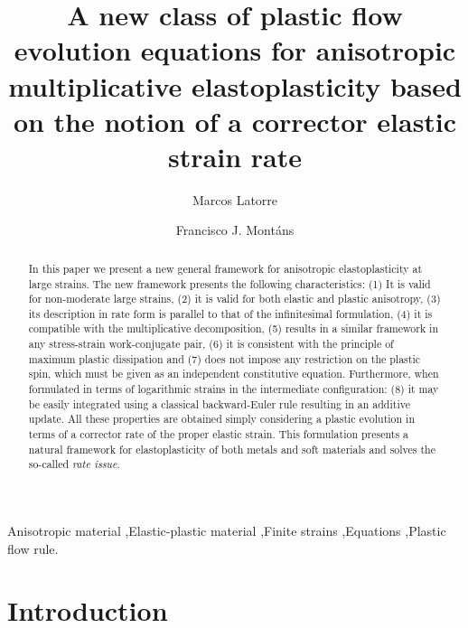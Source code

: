 \documentclass[preprint,review,12pt,sort&compress]{elsarticle}%
\begin{document}
\begin{frontmatter}
\title{A new class of plastic flow evolution equations for anisotropic
multiplicative elastoplasticity based on the notion of a corrector elastic strain rate}
\author[add1]{Marcos Latorre}
\author[add1]{Francisco J. Mont\'{a}ns}
\address[add1]{Escuela T\'{e}cnica Superior de Ingenier\'{\i}a Aeron\'{a}utica y del Espacio\\Universidad Polit\'{e}cnica de Madrid\\
Plaza Cardenal Cisneros, 3, 28040-Madrid, Spain\\}
\begin{abstract}
In this paper we present a new general framework for anisotropic elastoplasticity at large strains. The new framework
presents the following characteristics: (1) It is valid for non-moderate large strains, (2) it is valid for both elastic and
plastic anisotropy, (3) its description in rate form is parallel to that of the infinitesimal formulation, (4) it is compatible
with the multiplicative decomposition, (5) results in a similar framework in any stress-strain work-conjugate pair,
(6) it is consistent with the principle of maximum plastic dissipation and (7) does not impose any restriction on the
plastic spin, which must be given as an independent constitutive equation. Furthermore, when formulated
in terms of logarithmic strains in the intermediate configuration: (8) it may be easily integrated using a classical
backward-Euler rule resulting in an additive update. All these properties are obtained simply considering a plastic
evolution in terms of a corrector rate of the proper elastic strain. This formulation presents a natural framework for
elastoplasticity of both metals and soft materials and solves the so-called \emph{rate issue}.
\end{abstract}
\begin{keyword}
Anisotropic material \sep Elastic-plastic material \sep Finite strains \sep Equations \sep Plastic flow rule.
\end{keyword}
\end{frontmatter}


\section{Introduction}
\end{document}
